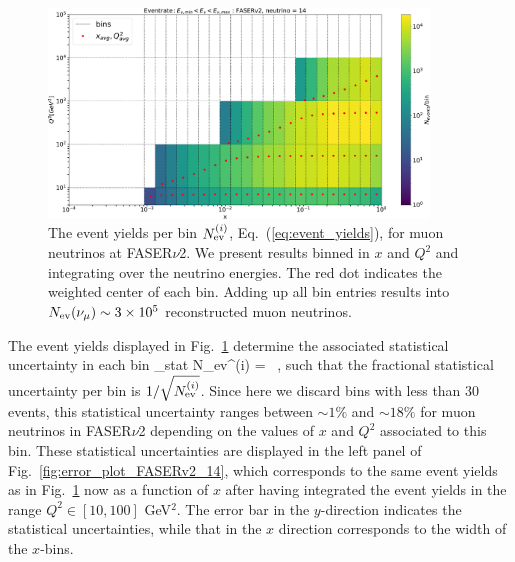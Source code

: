 \begin{figure}[t]
    \centering
\includegraphics[width=0.9\textwidth]{plots/Nevent_FASERv2_14.pdf}
\caption{The event yields per bin $ N_{\rm ev}^{(i)}$,  Eq.~(\ref{eq:event_yields}),
  for muon neutrinos at FASER$\nu$2.
  We present results binned in $x$ and $Q^2$ and integrating over the neutrino energies.
  The red dot indicates the weighted center of each bin.
  Adding up all bin entries results into $N_{\rm ev}(\nu_\mu)\sim 3\times 10^5 $ reconstructed muon
  neutrinos. }
    \label{fig:fasernu2_muon}
\end{figure}

The event yields displayed in Fig.~\ref{fig:fasernu2_muon} determine the associated
statistical uncertainty in each bin
\be
\label{eq:statistical_uncertainties}
\delta_{\rm stat}  N_{\rm ev}^{(i)} =  \, ,
\ee
such that the fractional statistical uncertainty per bin is $1/\sqrt{N_{\rm ev}^{(i)}}$.
%
Since here we discard bins with less than 30 events, this statistical uncertainty
ranges between $\sim 1\%$ and $\sim 18\%$ for muon neutrinos in FASER$\nu$2 depending on the values of
$x$ and $Q^2$ associated to this bin.
%
These statistical uncertainties are displayed in the left panel
of Fig.~\ref{fig:error_plot_FASERv2_14}, which corresponds
to the same event yields as in
Fig.~\ref{fig:fasernu2_muon}
now as a function of $x$ after having integrated the event yields in the range $Q^2 \in [10,100]$ GeV$^2$.
%
The error bar in the $y$-direction indicates the statistical uncertainties, while
that in the $x$ direction corresponds to the width of the $x$-bins.

